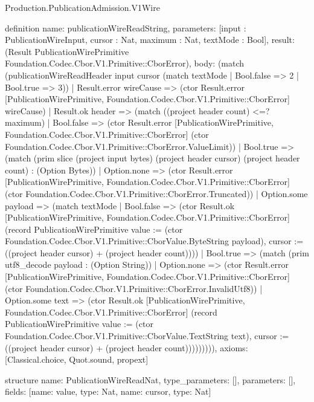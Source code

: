 \begin{lexlean}{Production.PublicationAdmission.V1Wire}
\begin{semanticmodule}
definition{
  name: publicationWireReadString,
  parameters: [input : PublicationWireInput, cursor : Nat, maximum : Nat, textMode : Bool],
  result: (Result PublicationWirePrimitive Foundation.Codec.Cbor.V1.Primitive::CborError),
  body: (match (publicationWireReadHeader input cursor (match textMode
      | Bool.false => 2
      | Bool.true => 3))
    | Result.error wireCause => (ctor Result.error [PublicationWirePrimitive, Foundation.Codec.Cbor.V1.Primitive::CborError] wireCause)
    | Result.ok header => (match ((project header count) <=? maximum)
      | Bool.false => (ctor Result.error [PublicationWirePrimitive, Foundation.Codec.Cbor.V1.Primitive::CborError] (ctor Foundation.Codec.Cbor.V1.Primitive::CborError.ValueLimit))
      | Bool.true => (match (prim slice (project input bytes) (project header cursor) (project header count) : (Option Bytes))
        | Option.none => (ctor Result.error [PublicationWirePrimitive, Foundation.Codec.Cbor.V1.Primitive::CborError] (ctor Foundation.Codec.Cbor.V1.Primitive::CborError.Truncated))
        | Option.some payload => (match textMode
          | Bool.false => (ctor Result.ok [PublicationWirePrimitive, Foundation.Codec.Cbor.V1.Primitive::CborError] (record PublicationWirePrimitive {value := (ctor Foundation.Codec.Cbor.V1.Primitive::CborValue.ByteString payload), cursor := ((project header cursor) + (project header count))}))
          | Bool.true => (match (prim utf8_decode payload : (Option String))
            | Option.none => (ctor Result.error [PublicationWirePrimitive, Foundation.Codec.Cbor.V1.Primitive::CborError] (ctor Foundation.Codec.Cbor.V1.Primitive::CborError.InvalidUtf8))
            | Option.some text => (ctor Result.ok [PublicationWirePrimitive, Foundation.Codec.Cbor.V1.Primitive::CborError] (record PublicationWirePrimitive {value := (ctor Foundation.Codec.Cbor.V1.Primitive::CborValue.TextString text), cursor := ((project header cursor) + (project header count))}))))))),
  axioms: [Classical.choice, Quot.sound, propext]
}

structure{
  name: PublicationWireReadNat,
  type_parameters: [],
  parameters: [],
  fields: [{name: value, type: Nat}, {name: cursor, type: Nat}]
}


\end{semanticmodule}
\end{lexlean}

